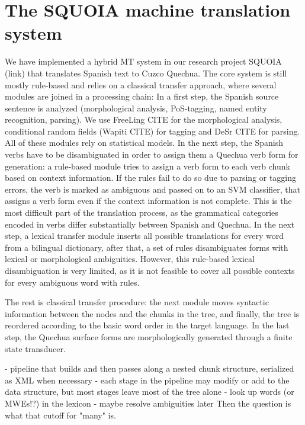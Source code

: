 \documentclass[10pt, a4paper]{article}
\begin{document}
\section{The SQUOIA machine translation system}
We have implemented a hybrid MT system in our research project SQUOIA (link)
that translates Spanish text to Cuzco Quechua. The core system is still mostly
rule-based and relies on a classical transfer approach, where several modules
are joined in a processing chain: In a first step, the Spanish source sentence
is analyzed (morphological analysis, PoS-tagging, named entity recognition,
parsing). We use FreeLing CITE for the morphological analysis, conditional
random fields (Wapiti CITE) for tagging and DeSr CITE for parsing. All of these
modules rely on statistical models. In the next step, the Spanish verbs have to
be disambiguated in order to assign them a Quechua verb form for generation: a
rule-based module tries to assign a verb form to each verb chunk based on
context information. If the rules fail to do so due to parsing or tagging
errors, the verb is marked as ambiguous and passed on to an SVM classifier,
that assigns a verb form even if the context information is not complete. This
is the most difficult part of the translation process, as the grammatical
categories encoded in verbs differ substantially between Spanish and Quechua.
In the next step, a lexical transfer module inserts all possible translations
for every word from a bilingual dictionary, after that, a set of rules
disambiguates forms with lexical or morphological ambiguities. However, this
rule-based lexical disambiguation is very limited, as it is not feasible to
cover all possible contexts for every ambiguous word with rules.

The rest is classical transfer procedure: the next module moves syntactic
information between the nodes and the chunks in the tree, and finally, the tree
is reordered according to the basic word order in the target language. In the
last step, the Quechua surface forms are morphologically generated through a
finite state transducer.

- pipeline that builds and then passes along a nested chunk structure, serialized as XML when necessary
- each stage in the pipeline may modify or add to the data structure, but most stages leave most of the tree alone
- look up words (or MWEs!?) in the lexicon
- maybe resolve ambiguities later
Then the question is what that cutoff for "many" is.
\end{document}
